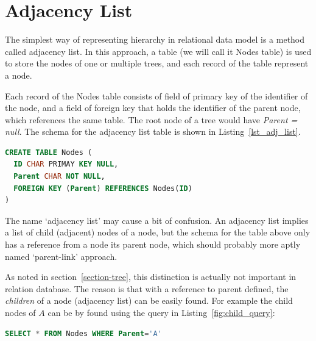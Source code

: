 
\section{Adjacency List}\label{sec-adj-list}

The simplest way of representing hierarchy in relational data model is a method called adjacency list. In this approach, a table (we will call it Nodes table) is used to store the nodes of one or multiple trees, and each record of the table represent a node.

Each record of the Nodes table consists of field of primary key of the identifier of the node, and a field of foreign key that holds the identifier of the parent node, which references the same table. The root node of a tree would have {\em Parent = null}. The schema for the adjacency list table is shown in Listing~\ref{lst_adj_list}.

\begin{lstlisting}[language=sql,caption=Schema for adjacency list, label=lst_adj_list, float]
CREATE TABLE Nodes (
  ID CHAR PRIMAY KEY NULL,
  Parent CHAR NOT NULL,
  FOREIGN KEY (Parent) REFERENCES Nodes(ID)
)
\end{lstlisting}

\begin{remark}[Note:] %

The name `adjacency list' may cause a bit of confusion. An adjacency list implies a list of child (adjacent) nodes of a node, but the schema for the table above only has a reference from a node its parent node, which should probably more aptly named `parent-link' approach.

As noted in section~\ref{section-tree}, this distinction is actually not important in relation database. The reason is that with a reference to parent defined, the {\em children} of a node (adjacency list) can be easily found. For example the child nodes of $A$ can be by found using the query in Listing~\ref{fig:child_query}:

\begin{lstlisting}[language=sql,caption=SQL for querying child nodes., label=fig:child_query, float]
SELECT * FROM Nodes WHERE Parent='A'
\end{lstlisting}

\end{remark} %


